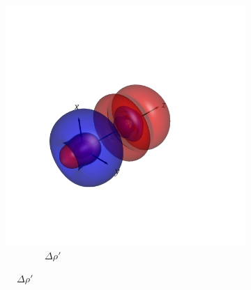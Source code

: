 \documentclass[journal=inoraj,manuscript=article]{achemso}
\begin{document}
\begin{figure}[!h]
    \centering
    \centering
    \begin{subfigure}[t]{0.33\textwidth}
        \centering
        \includegraphics[width=\linewidth]{./AuOg+/diff_tot.png} 
        \caption*{\ \ \ \ \ \ \ \ $\Delta \rho'$} 
    \end{subfigure}
    \hfill
 

\end{figure}
\end{document}
